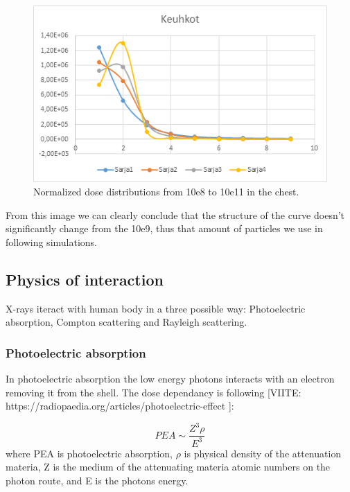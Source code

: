 \documentclass[fleqn,10pt]{SelfArx} %
\begin{document}
\begin{figure}[!hbt]\centering
\includegraphics[width=\linewidth]{PhotonNumber}
\caption{Normalized dose distributions from 10e8 to 10e11 in the chest.}
\label{fig:PhotonNumber}
\end{figure}


From this image we can clearly conclude that the structure of the curve doesn't significantly change from the 10e9, thus that amount of particles we use in following simulations.

\subsection{Physics of interaction}

X-rays iteract with human body in a three possible way: Photoelectric absorption, Compton scattering and Rayleigh scattering.

\subsubsection{Photoelectric absorption}
In photoelectric absorption the low energy photons interacts with an electron removing it from the shell. The dose dependancy is following [VIITE: https://radiopaedia.org/articles/photoelectric-effect ]: 

\begin{equation}
\label{eq:PEA}
PEA \sim \frac{Z^3 \rho}{E^3}
\end{equation}
where PEA is photoelectric absorption, $\rho$ is physical density of the attenuation materia, Z is the medium of the attenuating materia atomic numbers on the photon route, and E is the photons energy.
\end{document}
